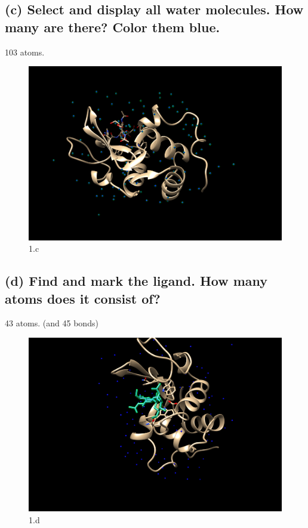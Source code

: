 \documentclass[a4paper, 12pt, one column]{article}
\begin{document}
\subsection*{(c) Select and display all water molecules. How many are there? Color them blue.}
103 atoms.\\
\begin{figure}[H]
    \centering
    \includegraphics[width=.8\linewidth]{1_c.png}
    \caption{1.c}
    \label{fig:1_c.png}
\end{figure}
\subsection*{(d) Find and mark the ligand. How many atoms does it consist of?}
43 atoms. (and 45 bonds)
\begin{figure}[H]
    \centering
    \includegraphics[width=.8\linewidth]{1_d.png}
    \caption{1.d}
    \label{fig:1_d.png}
\end{figure}
\end{document}
